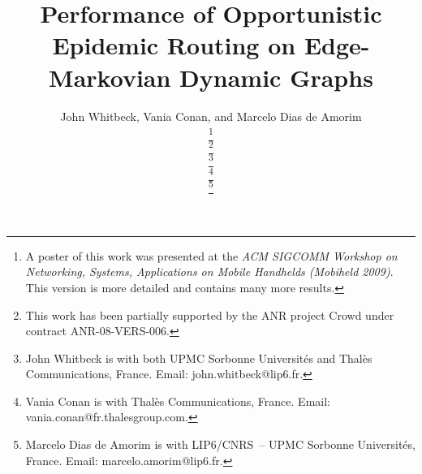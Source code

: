 \documentclass[final,journal,letterpaper]{IEEEtran}
\begin{document}
\title{Performance of Opportunistic Epidemic Routing on Edge-Markovian Dynamic Graphs}

\author{John Whitbeck, Vania Conan, and Marcelo Dias de Amorim

\thanks{A poster of this work was presented at the \emph{ACM SIGCOMM Workshop on Networking, Systems, Applications on Mobile Handhelds (Mobiheld 2009)}. This version is more detailed and contains many more results.}

\thanks{This work has been partially supported by the ANR project Crowd under contract ANR-08-VERS-006.}

\thanks{John Whitbeck is with both UPMC Sorbonne Universit{\'e}s and Thal{\`e}s Communications, France. Email: john.whitbeck@lip6.fr. }

\thanks{Vania Conan is with Thal{\`e}s Communications, France. Email: vania.conan@fr.thalesgroup.com.}

\thanks{Marcelo Dias de Amorim is with LIP6/CNRS~-- UPMC Sorbonne Universit{\'e}s, France. Email: marcelo.amorim@lip6.fr.}}
\end{document}
